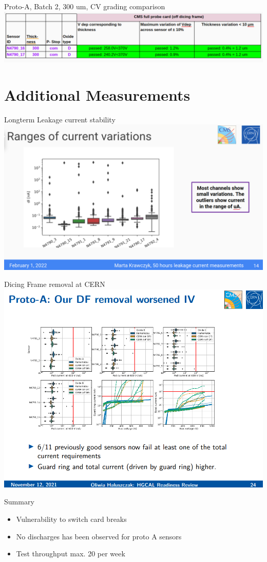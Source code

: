 \documentclass{beamer}
\begin{document}
\begin{frame}{Proto-A, Batch 2, 300 um, CV grading comparison}
  \includegraphics[width=.7\textwidth]{plots/CV_grading_300um_2.png}
\end{frame}



\section{Additional Measurements}

\begin{frame}{Longterm Leakage current stability}
  \includegraphics[width=.7\textwidth]{plots/Longterm_ranges.png}
\end{frame}

\begin{frame}{Dicing Frame removal at CERN}
  \includegraphics[width=.7\textwidth]{plots/Dicing_Frame_Removal.png}
\end{frame}

\begin{frame}{Summary}
  \begin{itemize}
    \item Vulnerability to switch card breaks
    \item No discharges has been observed for proto A sensors
    \item Test throughput max. 20 per week
  \end{itemize}
\end{frame}
\end{document}
